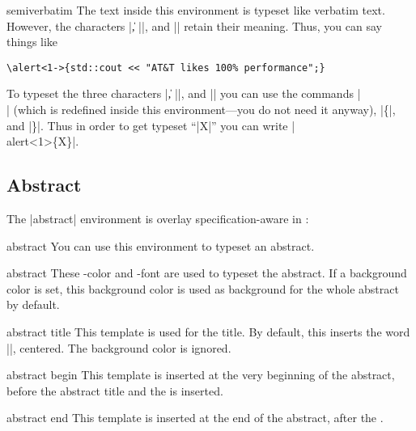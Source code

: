 \begin{environment}{{semiverbatim}}
  The text inside this environment is typeset like verbatim text. However, the characters |\|, |{|, and |}| retain their meaning. Thus, you can say things like
\begin{verbatim}
\alert<1->{std::cout << "AT&T likes 100% performance";}
\end{verbatim}

  To typeset the three characters |\|, |{|, and |}| you can use the commands |\\| (which is redefined inside this environment---you do not need it anyway), |\{|, and |\}|. Thus in order to get typeset ``|\alert<1>{X}|'' you can write |\\alert<1>\{X\}|.
\end{environment}


\subsection{Abstract}

The |{abstract}| environment is overlay specification-aware in \beamer:

\begin{environment}{{abstract}}
  You can use this environment to typeset an abstract.

  \begin{element}{abstract}\no\yes\yes
    These \beamer-color and -font are used to typeset the abstract. If a background color is set, this background color is used as background for the whole abstract by default.
  \end{element}

  \begin{element}{abstract title}\yes\yes\yes
    This template is used for the title. By default, this inserts the word |\abstractname|, centered. The background color is ignored.
  \end{element}

  \begin{element}{abstract begin}\yes\no\no
    This template is inserted at the very beginning of the abstract, before the abstract title and the  is inserted.
  \end{element}

  \begin{element}{abstract end}\yes\no\no
    This template is inserted at the end of the abstract, after the .
  \end{element}
\end{environment}


